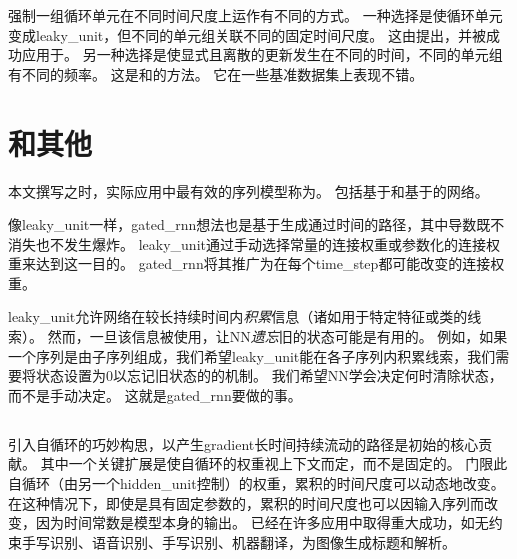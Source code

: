 
强制一组循环单元在不同时间尺度上运作有不同的方式。
一种选择是使循环单元变成\gls{leaky_unit}，但不同的单元组关联不同的固定时间尺度。
这由\cite{Mozer-nips92}提出，并被成功应用于\cite{Pascanu+al-ICML2013-small}。
另一种选择是使显式且离散的更新发生在不同的时间，不同的单元组有不同的频率。
这是\cite{ElHihi+Bengio-nips8}和\cite{Koutnik-et-al-ICML2014}的方法。
它在一些基准数据集上表现不错。

\section{和其他}
\label{sec:the_long_short_term_memory_and_other_gated_rnns}
本文撰写之时，实际应用中最有效的序列模型称为。
包括基于和基于的网络。

像\gls{leaky_unit}一样，\gls{gated_rnn}想法也是基于生成通过时间的路径，其中导数既不消失也不发生爆炸。
\gls{leaky_unit}通过手动选择常量的连接权重或参数化的连接权重来达到这一目的。
\gls{gated_rnn}将其推广为在每个\gls{time_step}都可能改变的连接权重。

\gls{leaky_unit}允许网络在较长持续时间内\emph{积累}信息（诸如用于特定特征或类的线索）。
然而，一旦该信息被使用，让\gls{NN}\emph{遗忘}旧的状态可能是有用的。
例如，如果一个序列是由子序列组成，我们希望\gls{leaky_unit}能在各子序列内积累线索，我们需要将状态设置为0以忘记旧状态的的机制。
我们希望\gls{NN}学会决定何时清除状态，而不是手动决定。
这就是\gls{gated_rnn}要做的事。

\subsection{}
\label{sec:lstm}
引入自循环的巧妙构思，以产生\gls{gradient}长时间持续流动的路径是初始的核心贡献\citep{Hochreiter+Schmidhuber-1997}。
其中一个关键扩展是使自循环的权重视上下文而定，而不是固定的\citep{Gers-et-al-2000}。
门限此自循环（由另一个\gls{hidden_unit}控制）的权重，累积的时间尺度可以动态地改变。
在这种情况下，即使是具有固定参数的，累积的时间尺度也可以因输入序列而改变，因为时间常数是模型本身的输出。
已经在许多应用中取得重大成功，如无约束手写识别\citep{Graves+Schmidhuber-2009}、语音识别\citep{Graves-et-al-ICASSP2013,Graves+Jaitly-ICML2014}、手写识别\citep{Graves-et-al-ICASSP2013}、机器翻译\citep{Sutskever-et-al-NIPS2014}，为图像生成标题\citep{Kiros-et-al-arxiv2014,Vinyals-et-al-arxiv2014,Xu-et-al-ICML2015}和解析\citep{Vinyals2014}。

